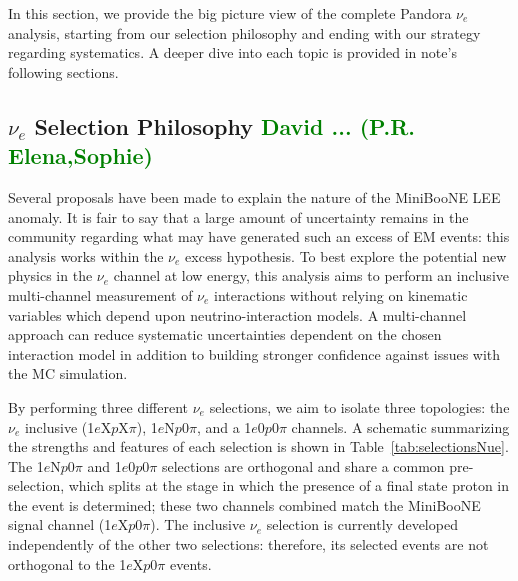 In this section, we provide the big picture view of the complete Pandora $\nu_e$ analysis, starting from our selection philosophy and ending with our strategy regarding systematics. A deeper dive into each topic is provided in note's following sections. 

\subsection{$\nu_e$ Selection Philosophy \textcolor{green}{David ... (P.R. Elena,Sophie) }}
\par Several proposals have been made to explain the nature of the MiniBooNE LEE anomaly. It is fair to say that a large amount of uncertainty remains in the community regarding what may have generated such an excess of EM events: this analysis works within the $\nu_e$ excess hypothesis.  To best explore the potential new physics in the $\nu_e$ channel at low energy, this analysis aims to perform an inclusive multi-channel measurement of $\nu_e$ interactions without relying on kinematic variables which depend upon neutrino-interaction models. A multi-channel approach can reduce systematic uncertainties dependent on the chosen interaction model in addition to building stronger confidence against issues with the MC simulation.

\par By performing three different $\nu_e$ selections, we aim to isolate three topologies: the $\nu_e$ inclusive (1$e$X$p$X$\pi$), 1$e$N$p$0$\pi$, and a 1$e$0$p$0$\pi$ channels. A schematic summarizing the strengths and features of each selection is shown in Table~\ref{tab:selectionsNue}. The 1$e$N$p$0$\pi$ and 1$e$0$p$0$\pi$ selections are orthogonal and share a common pre-selection, which splits at the stage in which the presence of a final state proton in the event is determined; these two channels combined match the MiniBooNE signal channel (1$e$X$p$0$\pi$). The inclusive $\nu_e$ selection is currently developed independently of the other two selections: therefore, its selected events are not orthogonal to the 1$e$X$p$0$\pi$ events.

